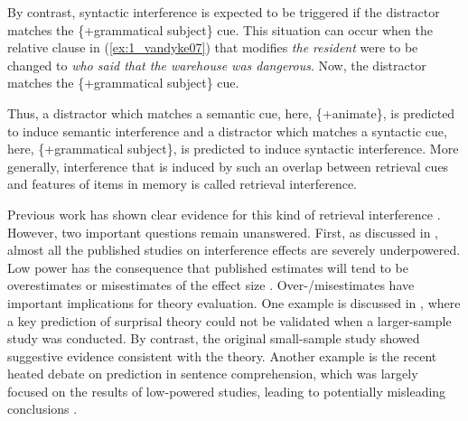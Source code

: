 \documentclass[review,preprint,12pt,authoryear,floatsintext]{elsarticle}
\begin{document}
By contrast, syntactic interference is expected to be triggered if the distractor matches the \{+grammatical subject\} cue. This situation can occur when the relative clause  in (\ref{ex:1_vandyke07}) that modifies \textit{the resident} were to be changed to \textit{who said that the warehouse was dangerous}. Now, the distractor matches the \{+grammatical subject\} cue.

Thus, a distractor which matches a semantic cue, here, \{+animate\}, is predicted to induce semantic interference and a distractor which matches a syntactic cue, here, \{+grammatical subject\}, is predicted to induce syntactic interference. More generally, interference that is induced by such an overlap between retrieval cues and features of items in memory is called retrieval interference.

Previous work has shown clear evidence for this kind of retrieval interference \citep{vandyke07, vandyke_mcelree06, vandyke_mcelree2011, nicenboim,  vandyke_lewis03,jaeger_etal_2017}. However, two important questions remain unanswered. First, as discussed in \cite{jaeger_etal_2017}, almost all the published studies on interference effects are severely underpowered. Low power has the consequence that published estimates will tend to be overestimates or misestimates of the effect size \citep{vasishth2018_signficancefilter}. Over-/misestimates have important implications for theory evaluation. One example is discussed in \cite{vasishth2018_signficancefilter}, where a key prediction of surprisal theory \citep{levy&keller_2013} could not be validated when a larger-sample study was conducted. By contrast, the original small-sample study \citep{levy&keller_2013} showed suggestive evidence consistent with the theory. Another example is the recent heated debate \citep{nieuwland_etal_2018} on prediction in sentence comprehension, which was largely focused on the results of low-powered studies, leading to potentially misleading conclusions \citep{nicenboim_etal_2020}.
\end{document}
